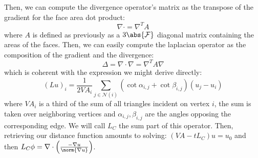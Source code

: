 \documentclass[math, info, english]{cours}
\def\mF{\mathcal{F}}
\begin{document}
Then, we can compute the divergence operator's matrix as the transpose of the gradient for the face area dot product:
\begin{equation}
	\nabla\cdot = \nabla^{T}A
\end{equation}
where $A$ is defined as previously as a $3\abs{\mF}$ diagonal matrix containing the areas of the faces.
Then, we can easily compute the laplacian operator as the composition of the gradient and the divergence:
\begin{equation}
	\Delta = \nabla \cdot \nabla = \nabla^{T}A\nabla
\end{equation}
which is coherent with the expression we might derive directly:
\begin{equation}
	\left( Lu \right)_{i} = \frac{1}{2VA_{i}}\sum_{j \in \mathcal{N}\left( i \right)}\left( \cot\alpha_{i, j} + \cot\beta_{i, j} \right)\left( u_{j} - u_{i} \right)
\end{equation}
where $VA_{i}$ is a third of the sum of all triangles incident on vertex $i$, the sum is taken over neighboring vertices and $\alpha_{i, j}, \beta_{i, j}$ are the angles opposing the corresponding edge.
We will call $L_{C}$ the sum part of this operator.
Then, retrieving our distance function amounts to solving: $\left(VA - tL_{C}\right)u = u_{0}$ and then $L_{C}\phi = \nabla\cdot \left( \frac{-\nabla u}{\norm{\nabla u}} \right)$.
\end{document}
